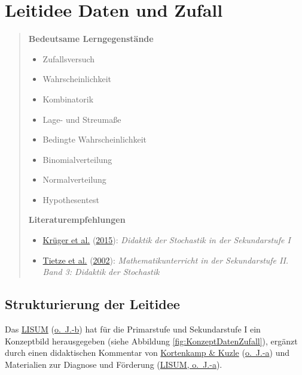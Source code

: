 \documentclass[
  ngerman,
]{scrbook}
\providecommand{\tightlist}{%
  \setlength{\itemsep}{0pt}\setlength{\parskip}{0pt}}
\theoremstyle{definition}
\theoremstyle{definition}
\theoremstyle{definition}
\theoremstyle{definition}
\theoremstyle{remark}
\begin{document}
\hypertarget{leitidee-daten-und-zufall}{%
\chapter{Leitidee Daten und Zufall}\label{leitidee-daten-und-zufall}}

\begin{quote}
\textbf{Bedeutsame Lerngegenstände}

\begin{itemize}
\tightlist
\item
  Zufallsversuch
\item
  Wahrscheinlichkeit
\item
  Kombinatorik
\item
  Lage- und Streumaße
\item
  Bedingte Wahrscheinlichkeit
\item
  Binomialverteilung
\item
  Normalverteilung
\item
  Hypothesentest
\end{itemize}

\textbf{Literaturempfehlungen}

\begin{itemize}
\tightlist
\item
  \protect\hyperlink{ref-Kruger2015}{Krüger et al.} (\protect\hyperlink{ref-Kruger2015}{2015}): \emph{Didaktik der Stochastik in der Sekundarstufe I}
\item
  \protect\hyperlink{ref-Tietze:2002}{Tietze et al.} (\protect\hyperlink{ref-Tietze:2002}{2002}): \emph{Mathematikunterricht in der Sekundarstufe II. Band 3: Didaktik der Stochastik}
\end{itemize}
\end{quote}

\hypertarget{strukturierung-der-leitidee-daten-und-zufall}{%
\section{Strukturierung der Leitidee}\label{strukturierung-der-leitidee-daten-und-zufall}}

Das \protect\hyperlink{ref-LISUMa}{LISUM} (\protect\hyperlink{ref-LISUMa}{o.~J.-b}) hat für die Primarstufe und Sekundarstufe I ein Konzeptbild herausgegeben (siehe Abbildung \ref{fig:KonzeptDatenZufall}), ergänzt durch einen didaktischen Kommentar von \protect\hyperlink{ref-Kortenkamp}{Kortenkamp \& Kuzle} (\protect\hyperlink{ref-Kortenkamp}{o.~J.-a}) und Materialien zur Diagnose und Förderung (\protect\hyperlink{ref-LISUM}{LISUM, o.~J.-a}).
\end{document}
